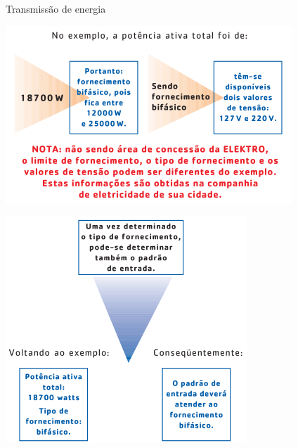\begin{frame}{Transmissão de energia}
	\begin{minipage}{0.49\linewidth}
		\centering
		\includegraphics[width=\linewidth]{Figuras/Ch03/fig19.1}
	\end{minipage}\hfill
	\begin{minipage}{0.49\linewidth}
		\centering
		\includegraphics[width=\linewidth]{Figuras/Ch03/fig19}
	\end{minipage}

\end{frame}


